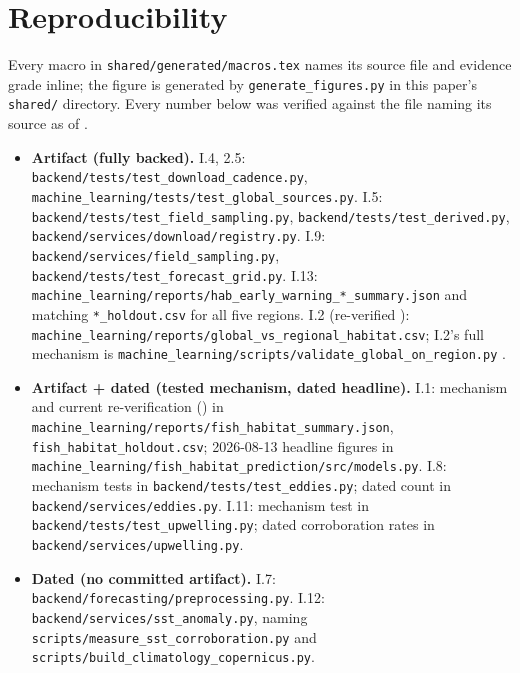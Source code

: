 \documentclass[conference]{IEEEtran}
\providecommand{\citep}[1]{\cite{#1}}
\begin{document}
\section*{Reproducibility}
Every macro in \texttt{shared/generated/macros.tex} names its source file and
evidence grade inline; the figure is generated by
\texttt{generate\_figures.py} in this paper's \texttt{shared/} directory.
Every number below was verified against the file naming its source as of
\AsOf{}.
{\raggedright\sloppy
\begin{itemize}\itemsep1pt\parskip0pt
\item[] \textbf{Artifact (fully backed).} I.4, 2.5:
\texttt{backend/tests/\allowbreak{}test\_download\_cadence.py},
\texttt{machine\_learning/tests/\allowbreak{}test\_global\_sources.py}. I.5:
\texttt{backend/tests/\allowbreak{}test\_field\_sampling.py},
\texttt{backend/tests/\allowbreak{}test\_derived.py},
\texttt{backend/services/\allowbreak{}download/registry.py}. I.9:
\texttt{backend/services/\allowbreak{}field\_sampling.py},
\texttt{backend/tests/\allowbreak{}test\_forecast\_grid.py}. I.13:
\texttt{machine\_learning/reports/\allowbreak{}hab\_early\_warning\_*\_summary.json}
and matching \texttt{*\_holdout.csv} for all five regions. I.2
(re-verified \AsOf{}): \texttt{machine\_learning/reports/\allowbreak{}global\_vs\_regional\_habitat.csv};
I.2's full mechanism is \texttt{machine\_learning/scripts/\allowbreak{}validate\_global\_on\_region.py}
\citep{moredata2026}.
\item[] \textbf{Artifact + dated (tested mechanism, dated headline).} I.1:
mechanism and current re-verification (\AsOf{}) in
\texttt{machine\_learning/reports/\allowbreak{}fish\_habitat\_summary.json},
\texttt{fish\_habitat\_holdout.csv}; 2026-08-13 headline figures in
\texttt{machine\_learning/fish\_habitat\_prediction/\allowbreak{}src/models.py}.
I.8: mechanism tests in \texttt{backend/tests/\allowbreak{}test\_eddies.py};
dated count in \texttt{backend/services/\allowbreak{}eddies.py}. I.11:
mechanism test in \texttt{backend/tests/\allowbreak{}test\_upwelling.py};
dated corroboration rates in \texttt{backend/services/\allowbreak{}upwelling.py}.
\item[] \textbf{Dated (no committed artifact).} I.7:
\texttt{backend/forecasting/\allowbreak{}preprocessing.py}. I.12:
\texttt{backend/services/\allowbreak{}sst\_anomaly.py}, naming
\texttt{scripts/measure\_sst\_corroboration.py} and
\texttt{scripts/build\_climatology\_copernicus.py}.
\end{itemize}}



\end{document}
